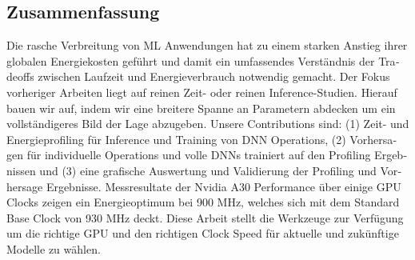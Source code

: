 \begin{otherlanguage}{ngerman}
\chapter*{Zusammenfassung}



Die rasche Verbreitung von ML Anwendungen hat zu einem starken Anstieg ihrer globalen Energiekosten geführt und damit ein umfassendes Verständnis der Tradeoffs zwischen Laufzeit und Energieverbrauch notwendig gemacht. Der Fokus vorheriger Arbeiten liegt auf reinen Zeit- oder reinen Inference-Studien. Hierauf bauen wir auf, indem wir eine breitere Spanne an Parametern abdecken um ein vollständigeres Bild der Lage abzugeben. Unsere Contributions sind: (1) Zeit- und Energieprofiling für Inference und Training von DNN Operations, (2) Vorhersagen für individuelle Operations und volle DNNs trainiert auf den Profiling Ergebnissen und (3) eine grafische Auswertung und Validierung der Profiling und Vorhersage Ergebnisse. Messresultate der Nvidia A30 Performance über einige GPU Clocks zeigen ein Energieoptimum bei 900 MHz, welches sich mit dem Standard Base Clock von 930 MHz deckt. Diese Arbeit stellt die Werkzeuge zur Verfügung um die richtige GPU und den richtigen Clock Speed für aktuelle und zukünftige Modelle zu wählen.
\end{otherlanguage}

\endgroup

\vfill
